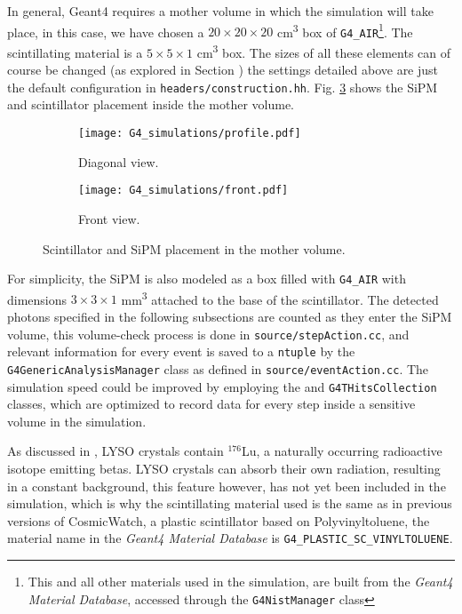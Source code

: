 In general, Geant4 requires a mother volume in which the simulation will take place, in this case, we have chosen a $20\times20\times20$ \unit{\cm\cubed} box of \texttt{G4\_AIR}\footnote{This and all other materials used in the simulation, are built from the \textit{Geant4 Material Database}, accessed through the \texttt{G4NistManager} class}. The scintillating material is a $5\times5\times1$ \unit{\cm\cubed} box. The sizes of all these elements can of course be changed (as explored in Section ) the settings detailed above are just the default configuration in \texttt{headers/construction.hh}. Fig. \ref{fig:geometry} shows the SiPM and scintillator placement inside the mother volume.

\begin{figure}[H]
  \centering
  \begin{subfigure}[t]{0.48\textwidth}
    \texttt{[image: G4\_simulations/profile.pdf]}
    \caption{\label{sfig:geometry_profile}Diagonal view.}
  \end{subfigure}
  \hfill
  \begin{subfigure}[t]{0.48\textwidth}
    \texttt{[image: G4\_simulations/front.pdf]}
    \caption{\label{sfig:geometry_front}Front view.}
  \end{subfigure}
  \caption{\label{fig:geometry}Scintillator and SiPM placement in the mother volume.}
\end{figure}

For simplicity, the SiPM is also modeled as a box filled with \texttt{G4\_AIR} with dimensions $3\times3\times1$ \unit{\mm\cubed} attached to the base of the scintillator. The detected photons specified in the following subsections are counted as they enter the SiPM volume, this volume-check process is done in \texttt{source/stepAction.cc}, and relevant information for every event is saved to a \texttt{ntuple} by the \texttt{G4GenericAnalysisManager} class as defined in \texttt{source/eventAction.cc}. The simulation speed could be improved by employing the  and \texttt{G4THitsCollection} classes, which are optimized to record data for every step inside a sensitive volume in the simulation.

As discussed in , LYSO crystals contain $^{176}$Lu, a naturally occurring radioactive isotope emitting betas. LYSO crystals can absorb their own radiation, resulting in a constant background, this feature however, has not yet been included in the simulation, which is why the scintillating material used is the same as in previous versions of CosmicWatch, a plastic scintillator based on Polyvinyltoluene, the material name in the \textit{Geant4 Material Database} is \texttt{G4\_PLASTIC\_SC\_VINYLTOLUENE}.

